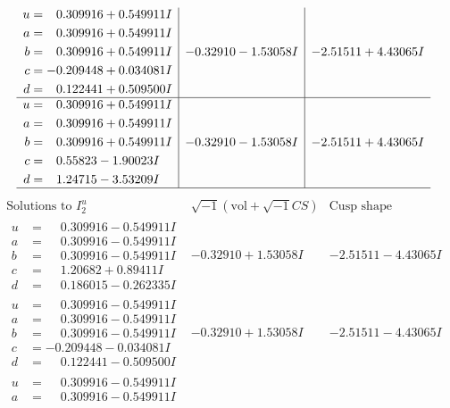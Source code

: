 \documentclass[1p]{elsarticle_modified}
\theoremstyle{definition}
\newcommand{\I}{\sqrt{-1}}
\begin{document}
$$\begin{array}{c|c|c}
\begin{aligned}
u &= \phantom{-}0.309916 + 0.549911 I \\
a &= \phantom{-}0.309916 + 0.549911 I \\
b &= \phantom{-}0.309916 + 0.549911 I \\
c &= -0.209448 + 0.034081 I \\
d &= \phantom{-}0.122441 + 0.509500 I\end{aligned}
 & -0.32910 - 1.53058 I & -2.51511 + 4.43065 I \\ \hline\begin{aligned}
u &= \phantom{-}0.309916 + 0.549911 I \\
a &= \phantom{-}0.309916 + 0.549911 I \\
b &= \phantom{-}0.309916 + 0.549911 I \\
c &= \phantom{-}0.55823 - 1.90023 I \\
d &= \phantom{-}1.24715 - 3.53209 I\end{aligned}
 & -0.32910 - 1.53058 I & -2.51511 + 4.43065 I\\
 \hline 
 \end{array}$$\newpage$$\begin{array}{c|c|c}  
\text{Solutions to }I^u_{2}& \I (\text{vol} + \sqrt{-1}CS) & \text{Cusp shape}\\
 \hline 
\begin{aligned}
u &= \phantom{-}0.309916 - 0.549911 I \\
a &= \phantom{-}0.309916 - 0.549911 I \\
b &= \phantom{-}0.309916 - 0.549911 I \\
c &= \phantom{-}1.20682 + 0.89411 I \\
d &= \phantom{-}0.186015 - 0.262335 I\end{aligned}
 & -0.32910 + 1.53058 I & -2.51511 - 4.43065 I \\ \hline\begin{aligned}
u &= \phantom{-}0.309916 - 0.549911 I \\
a &= \phantom{-}0.309916 - 0.549911 I \\
b &= \phantom{-}0.309916 - 0.549911 I \\
c &= -0.209448 - 0.034081 I \\
d &= \phantom{-}0.122441 - 0.509500 I\end{aligned}
 & -0.32910 + 1.53058 I & -2.51511 - 4.43065 I \\ \hline\begin{aligned}
u &= \phantom{-}0.309916 - 0.549911 I \\
a &= \phantom{-}0.309916 - 0.549911 I \\

\end{aligned}
\end{array}$$
\end{document}
